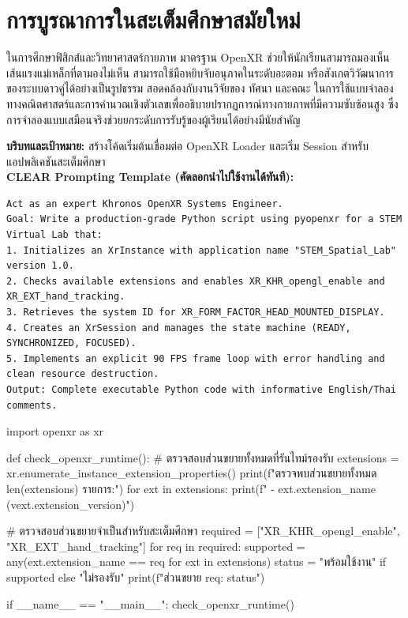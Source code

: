 \section{การบูรณาการในสะเต็มศึกษาสมัยใหม่}

ในการศึกษาฟิสิกส์และวิทยาศาสตร์กายภาพ มาตรฐาน OpenXR ช่วยให้นักเรียนสามารถมองเห็นเส้นแรงแม่เหล็กที่ตามองไม่เห็น สามารถใช้มือหยิบจับอนุภาคในระดับอะตอม หรือสังเกตวิวัฒนาการของระบบดาวคู่ได้อย่างเป็นรูปธรรม สอดคล้องกับงานวิจัยของ ทัศนา และคณะ ในการใช้แบบจำลองทางคณิตศาสตร์และการคำนวณเชิงตัวเลขเพื่ออธิบายปรากฏการณ์ทางกายภาพที่มีความซับซ้อนสูง ซึ่งการจำลองแบบเสมือนจริงช่วยยกระดับการรับรู้ของผู้เรียนได้อย่างมีนัยสำคัญ

\begin{aipromptbox}
\textbf{บริบทและเป้าหมาย:} สร้างโค้ดเริ่มต้นเชื่อมต่อ OpenXR Loader และเริ่ม Session สำหรับแอปพลิเคชันสะเต็มศึกษา\\
\textbf{CLEAR Prompting Template (คัดลอกนำไปใช้งานได้ทันที):}
\begin{lstlisting}[style=openxrcode]
Act as an expert Khronos OpenXR Systems Engineer.
Goal: Write a production-grade Python script using pyopenxr for a STEM Virtual Lab that:
1. Initializes an XrInstance with application name "STEM_Spatial_Lab" version 1.0.
2. Checks available extensions and enables XR_KHR_opengl_enable and XR_EXT_hand_tracking.
3. Retrieves the system ID for XR_FORM_FACTOR_HEAD_MOUNTED_DISPLAY.
4. Creates an XrSession and manages the state machine (READY, SYNCHRONIZED, FOCUSED).
5. Implements an explicit 90 FPS frame loop with error handling and clean resource destruction.
Output: Complete executable Python code with informative English/Thai comments.
\end{lstlisting}
\end{aipromptbox}

\begin{codebox}
import openxr as xr

def check_openxr_runtime():
    # ตรวจสอบส่วนขยายทั้งหมดที่รันไทม์รองรับ
    extensions = xr.enumerate_instance_extension_properties()
    print(f"ตรวจพบส่วนขยายทั้งหมด {len(extensions)} รายการ:")
    for ext in extensions:
        print(f" - {ext.extension_name} (v{ext.extension_version})")

    # ตรวจสอบส่วนขยายจำเป็นสำหรับสะเต็มศึกษา
    required = ["XR_KHR_opengl_enable", "XR_EXT_hand_tracking"]
    for req in required:
        supported = any(ext.extension_name == req for ext in extensions)
        status = "พร้อมใช้งาน" if supported else "ไม่รองรับ"
        print(f"ส่วนขยาย {req}: {status}")

if __name__ == "__main__":
    check_openxr_runtime()
\end{codebox}

